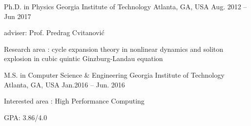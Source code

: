 


\begin{cventries}

\cventry
{Ph.D. in Physics}
{Georgia Institute of Technology}
{Atlanta, GA, USA}
{Aug. 2012 -- Jun 2017}
{
  \begin{cvitems}
    \item adviser: Prof. Predrag Cvitanovi\'c
    \item Research area : cycle expansion theory in nonlinear dynamics and
      soliton explosion in cubic quintic Ginzburg-Landau equation
  \end{cvitems}
}


\cventry
{M.S. in Computer Science \& Engineering }
{Georgia Institute of Technology}
{Atlanta, GA, USA}
{Jan.2016 -- Jun. 2016}
{
  \begin{cvitems}
    \item Interested area : High Performance Computing
    \item GPA: 3.86/4.0
  \end{cvitems}
}





\end{cventries}
